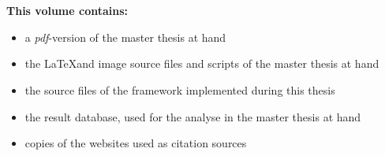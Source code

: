 \chapter*{}
\thispagestyle{empty}

\begin{center}
	\vspace{-3cm}
\end{center}

\vfill

\textbf{This volume contains:}
\begin{itemize}
 \item a \emph{pdf}-version of the master thesis at hand
 \item the \LaTeX and image source files and scripts of the master thesis at hand
 \item the source files of the \gls{framework} implemented during this thesis
 \item the result database, used for the analyse in the master thesis at hand
 \item copies of the websites used as citation sources
\end{itemize}
